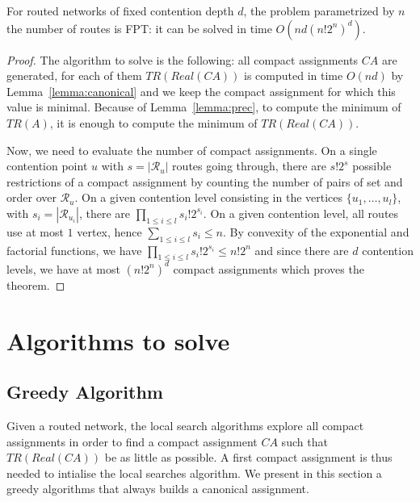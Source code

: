 \documentclass[english]{article}
\begin{document}

\begin{theorem}\label{theorem:FPT}
For routed networks of fixed contention depth $d$, the problem \spall parametrized by $n$ the number of routes is FPT: it can be solved in time $O(nd(n!2^{n})^{d})$.
\end{theorem}
\begin{proof}
The algorithm to solve \spall is the following: all compact assignments $CA$ are generated, for each of them $TR(Real(CA))$ is computed in time
$O(nd)$ by Lemma~\ref{lemma:canonical} and we keep the compact assignment for which this value is minimal.  Because of Lemma~\ref{lemma:prec}, to compute the minimum of $TR(A)$, it is enough 
to compute the minimum of $TR(Real(CA))$.

 Now, we need to evaluate the number of compact assignments. 
On a single contention point $u$ with $s = |\mathcal{R}_u|$ routes going through, there are $s!2^s$ possible restrictions of a compact assignment by counting the number of pairs of set and order over $\mathcal{R}_u$.
On a given contention level consisting in the vertices $\{u_1,\dots,u_l\}$, with $s_i = |\mathcal{R}_{u_{i}}|$, there are 
$\prod_{1 \leq i\leq l} s_i!2^{s_i}$. On a given contention level, all routes use at most $1$ vertex, hence $\sum_{1 \leq i\leq l} s_i \leq n$. 
By convexity of the exponential and factorial functions, we have $\prod_{1 \leq i\leq l} s_i!2^{s_i} \leq n!2^n$ and since there are $d$ contention levels,
we have at most $ (n!2^{n})^{d}$ compact assignments which proves the theorem.
\end{proof}




\section{Algorithms to solve \spall}


\subsection{Greedy Algorithm}
Given a routed network, the local search algorithms explore all compact assignments in order to find a compact assignment $CA$ such that $TR(Real(CA))$ be as little as possible. A first compact assignment is thus needed to intialise the local searches algorithm.
We present in this section a greedy algorithms that always builds a canonical assignment.
\end{document}
